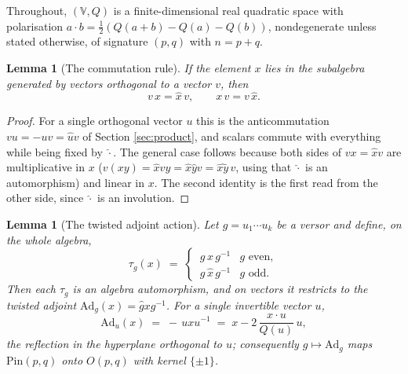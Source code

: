 \documentclass[11pt]{article}
\theoremstyle{plain}
\newtheorem{lemma}[theorem]{Lemma}
\theoremstyle{definition}
\newcommand{\Pin}{\mathrm{Pin}}
\newcommand{\Ad}{\mathrm{Ad}}
\begin{document}
Throughout, $(\mathbb{V}, Q)$ is a finite-dimensional real quadratic space with polarisation $a \cdot b = \tfrac12(Q(a+b) - Q(a) - Q(b))$, nondegenerate unless stated otherwise, of signature $(p,q)$ with $n = p + q$.

\begin{lemma}[The commutation rule]\label{tk:commutation}
If the element $x$ lies in the subalgebra generated by vectors orthogonal to a vector $v$, then
\begin{equation}\label{eq:tkcommutation}
v\,x = \hat{x}\,v, \qquad x\,v = v\,\hat{x} .
\end{equation}
\end{lemma}

\begin{proof}
For a single orthogonal vector $u$ this is the anticommutation $vu = -uv = \hat{u}v$ of Section \ref{sec:product}, and scalars commute with everything while being fixed by $\hat{\cdot}$. The general case follows because both sides of $vx = \hat{x}v$ are multiplicative in $x$ ($v(xy) = \hat{x}vy = \hat{x}\hat{y}v = \widehat{xy}\,v$, using that $\hat{\cdot}$ is an automorphism) and linear in $x$. The second identity is the first read from the other side, since $\hat{\cdot}$ is an involution.
\end{proof}

\begin{lemma}[The twisted adjoint action]\label{tk:tau}
Let $g = u_1 \cdots u_k$ be a versor and define, on the whole algebra,
\begin{equation}\label{eq:tktau}
\tau_g(x) \;=\;
\begin{cases}
\,g\, x\, g^{-1} & g \text{ even},\\[2pt]
\,g\, \hat{x}\, g^{-1} & g \text{ odd}.
\end{cases}
\end{equation}
Then each $\tau_g$ is an algebra automorphism, and on vectors it restricts to the twisted adjoint $\Ad_g(x) = \hat{g} x g^{-1}$. For a single invertible vector $u$,
\[
\Ad_u(x) \;=\; -\,u x u^{-1} \;=\; x - 2\,\frac{x \cdot u}{Q(u)}\,u ,
\]
the reflection in the hyperplane orthogonal to $u$; consequently $g \mapsto \Ad_g$ maps $\Pin(p,q)$ onto $O(p,q)$ with kernel $\{\pm 1\}$.
\end{lemma}
\end{document}
